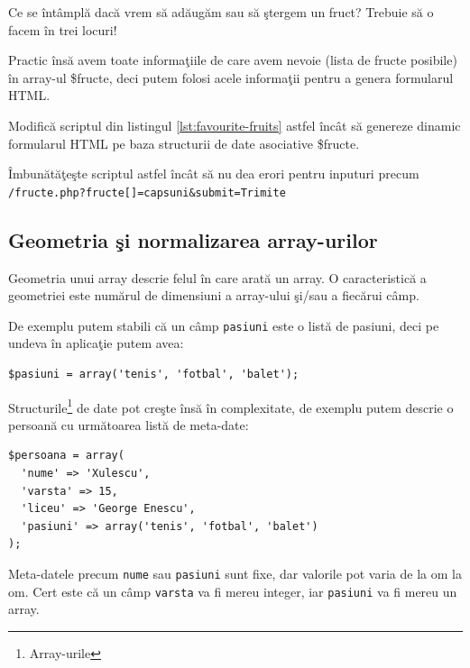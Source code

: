 Ce se întâmplă dacă vrem să adăugăm sau
să ştergem un fruct? Trebuie să o facem în trei locuri!

Practic însă avem toate informaţiile de care avem nevoie (lista de fructe posibile) în array-ul \$fructe,
deci putem folosi acele informaţii pentru a genera formularul HTML.

\begin{Exercise}[title={Structuri de date abstracte},difficulty=1]
Modifică scriptul din listingul \ref{lst:favourite-fruits} astfel încât să genereze dinamic
formularul HTML pe baza structurii de date asociative \$fructe.

Îmbunătăţeşte scriptul astfel încât să nu dea erori pentru inputuri precum\\
\texttt{/fructe.php?fructe[]=capsuni\&submit=Trimite}
\end{Exercise}


\subsection{Geometria şi normalizarea array-urilor}
Geometria unui array descrie felul în care arată un array. O caracteristică
a geometriei este numărul de dimensiuni a array-ului şi/sau a fiecărui câmp.

De exemplu putem stabili că un câmp \texttt{pasiuni} este o listă de pasiuni,
deci pe undeva în aplicaţie putem avea:
\begin{lstlisting}
$pasiuni = array('tenis', 'fotbal', 'balet');
\end{lstlisting}

Structurile\footnote{Array-urile} de date pot creşte însă în complexitate, de
exemplu putem descrie o persoană cu următoarea listă de meta-date:
\begin{lstlisting}
$persoana = array(
  'nume' => 'Xulescu',
  'varsta' => 15,
  'liceu' => 'George Enescu',
  'pasiuni' => array('tenis', 'fotbal', 'balet')
);
\end{lstlisting}
Meta-datele precum \texttt{nume} sau \texttt{pasiuni} sunt fixe, dar valorile
pot varia de la om la om. Cert este că un câmp \texttt{varsta} va fi mereu
integer, iar \texttt{pasiuni} va fi mereu un array.

